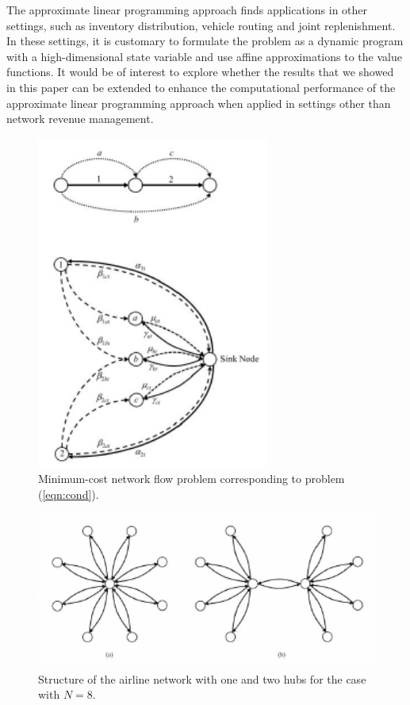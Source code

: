 The approximate linear programming approach finds applications in other settings, such as inventory distribution, vehicle routing and joint replenishment. In these settings, it is customary to formulate the problem as a dynamic program with a high-dimensional state variable and use affine approximations to the value functions. It would be of interest to explore whether the results that we showed in this paper can be extended to enhance the computational performance of the approximate linear programming approach when applied in settings other than network revenue management.\\

\begin{figure}
\begin{center}
\includegraphics[width=3in]{approximate_lp_rm/figures/mincost.pdf}
\caption{Minimum-cost network flow problem corresponding to problem (\ref{eqn:cond}).}
\label{fig:network}
\end{center}
\end{figure}


\begin{figure}
\begin{center}
\includegraphics[width=6in]{approximate_lp_rm/figures/network.pdf}
\caption{Structure of the airline network with one and two hubs for the case with $N=8$.}
\label{fig:network}

\end{center}
\end{figure}

